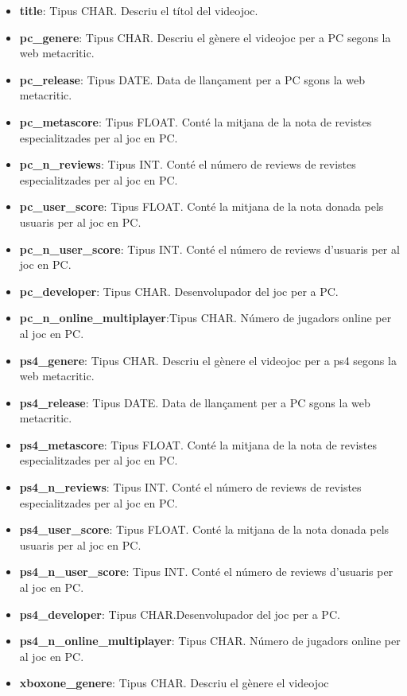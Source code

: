 \documentclass[]{article}
\providecommand{\tightlist}{%
  \setlength{\itemsep}{0pt}\setlength{\parskip}{0pt}}
\begin{document}
\begin{itemize}
\tightlist
\item
  \textbf{title}: Tipus CHAR. Descriu el títol del videojoc.
\item
  \textbf{pc\_genere}: Tipus CHAR. Descriu el gènere el videojoc per a
  PC segons la web metacritic.
\item
  \textbf{pc\_release}: Tipus DATE. Data de llançament per a PC sgons la
  web metacritic.
\item
  \textbf{pc\_metascore}: Tipus FLOAT. Conté la mitjana de la nota de
  revistes especialitzades per al joc en PC.
\item
  \textbf{pc\_n\_reviews}: Tipus INT. Conté el número de reviews de
  revistes especialitzades per al joc en PC.
\item
  \textbf{pc\_user\_score}: Tipus FLOAT. Conté la mitjana de la nota
  donada pels usuaris per al joc en PC.
\item
  \textbf{pc\_n\_user\_score}: Tipus INT. Conté el número de reviews
  d'usuaris per al joc en PC.
\item
  \textbf{pc\_developer}: Tipus CHAR. Desenvolupador del joc per a PC.
\item
  \textbf{pc\_n\_online\_multiplayer}:Tipus CHAR. Número de jugadors
  online per al joc en PC.
\item
  \textbf{ps4\_genere}: Tipus CHAR. Descriu el gènere el videojoc per a
  ps4 segons la web metacritic.
\item
  \textbf{ps4\_release}: Tipus DATE. Data de llançament per a PC sgons
  la web metacritic.
\item
  \textbf{ps4\_metascore}: Tipus FLOAT. Conté la mitjana de la nota de
  revistes especialitzades per al joc en PC.
\item
  \textbf{ps4\_n\_reviews}: Tipus INT. Conté el número de reviews de
  revistes especialitzades per al joc en PC.
\item
  \textbf{ps4\_user\_score}: Tipus FLOAT. Conté la mitjana de la nota
  donada pels usuaris per al joc en PC.
\item
  \textbf{ps4\_n\_user\_score}: Tipus INT. Conté el número de reviews
  d'usuaris per al joc en PC.
\item
  \textbf{ps4\_developer}: Tipus CHAR.Desenvolupador del joc per a PC.
\item
  \textbf{ps4\_n\_online\_multiplayer}: Tipus CHAR. Número de jugadors
  online per al joc en PC.
\item
  \textbf{xboxone\_genere}: Tipus CHAR. Descriu el gènere el videojoc

\end{itemize}
\end{document}
